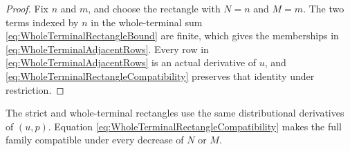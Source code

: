 \begin{proof}
Fix \(n\) and \(m\), and choose the rectangle with \(N=n\) and \(M=m\).
The two terms indexed by \(n\) in the whole-terminal sum \eqref{eq:WholeTerminalRectangleBound} are finite, which gives the memberships in \eqref{eq:WholeTerminalAdjacentRows}.
Every row in \eqref{eq:WholeTerminalAdjacentRows} is an actual derivative of \(u\), and \eqref{eq:WholeTerminalRectangleCompatibility} preserves that identity under restriction.
\end{proof}

The strict and whole-terminal rectangles use the same distributional derivatives of \((u,p)\).
Equation \eqref{eq:WholeTerminalRectangleCompatibility} makes the full family compatible under every decrease of \(N\) or \(M\).
